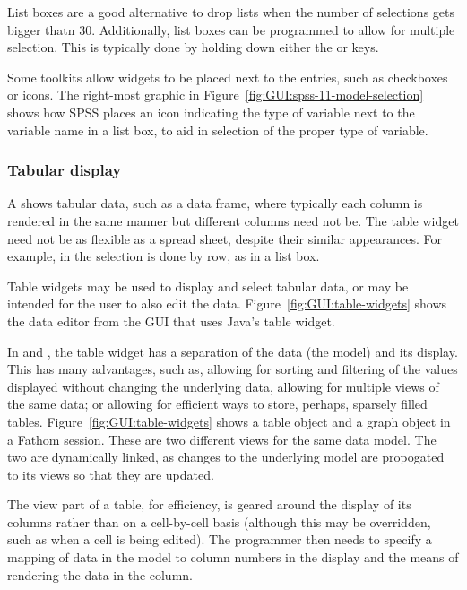 List boxes are a good alternative to drop lists when the number of
selections gets bigger thatn 30. Additionally, list boxes can be
programmed to allow for multiple selection. This is typically done by
holding down either the  or  keys.

Some toolkits allow widgets to be placed next to the entries, such as
checkboxes or icons. The right-most graphic in
Figure~\ref{fig:GUI:spss-11-model-selection} shows how SPSS places an icon
indicating the type of variable next to the variable name in a list
box, to aid in selection of the proper type of variable.



\subsubsection{Tabular display}
\label{sec:GUI:tabular-display}

A  shows tabular data, such as a data frame, where
typically each column is rendered in the same manner but different
columns need not be. The table widget need not be as flexible as a
spread sheet, despite their similar appearances. For example, in
\GTK\/ the selection is done by row, as in a list box. 

Table widgets may be used to display and select tabular data, or may
be intended for the user to also edit the
data. Figure~\ref{fig:GUI:table-widgets} shows the data editor from the
 GUI that uses Java's table widget.

In  and , the table widget has a separation of
the data (the model) and its display. This has many advantages, such
as, allowing for sorting and filtering of the values displayed without
changing the underlying data, allowing for multiple views of the same
data; or allowing for efficient ways to store, perhaps, sparsely
filled tables. Figure~\ref{fig:GUI:table-widgets} shows a table object
and a graph object in a Fathom session. These are two different views
for the same data model. The two are dynamically linked, as changes to
the underlying model are propogated to its views so that they are
updated.

The view part of a table, for efficiency, is geared around the display
of its columns rather than on a cell-by-cell basis (although this may
be overridden, such as when a cell is being edited). The programmer
then needs to specify a mapping of data in the model to column numbers
in the display and the means of rendering the data in the column.



